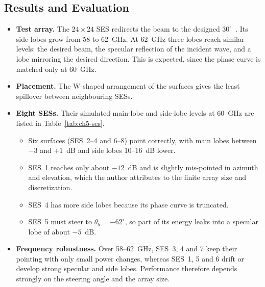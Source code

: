 \subsection{Results and Evaluation}
\begin{itemize}
    \item \textbf{Test array.} The $24 \times 24$ SES redirects the beam to the designed $30^\circ$~\cite{Sabato2025}. Its side lobes grow from 58 to 62~GHz. At 62~GHz three lobes reach similar levels: the desired beam, the specular reflection of the incident wave, and a lobe mirroring the desired direction. This is expected, since the phase curve is matched only at 60~GHz.
    \item \textbf{Placement.} The W-shaped arrangement of the surfaces gives the least spillover between neighbouring SESs.
    \item \textbf{Eight SESs.} Their simulated main-lobe and side-lobe levels at 60~GHz are listed in Table~\ref{tab:ch5-ses}.
    \begin{itemize}
        \item Six surfaces (SES~2--4 and 6--8) point correctly, with main lobes between $-3$ and $+1$~dB and side lobes 10--16~dB lower.
        \item SES~1 reaches only about $-12$~dB and is slightly mis-pointed in azimuth and elevation, which the author attributes to the finite array size and discretization.
        \item SES~4 has more side lobes because its phase curve is truncated.
        \item SES~5 must steer to $\theta_b = -62^\circ$, so part of its energy leaks into a specular lobe of about $-5$~dB.
    \end{itemize}
    \item \textbf{Frequency robustness.} Over 58--62~GHz, SES~3, 4 and 7 keep their pointing with only small power changes, whereas SES~1, 5 and 6 drift or develop strong specular and side lobes. Performance therefore depends strongly on the steering angle and the array size.
\end{itemize}

